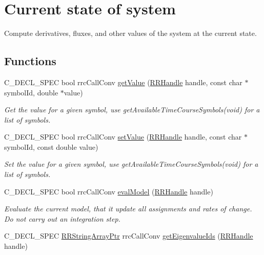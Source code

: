 \hypertarget{group__state}{}\section{Current state of system}
\label{group__state}


Compute derivatives, fluxes, and other values of the system at the current state.  


\subsection*{Functions}
\begin{DoxyCompactItemize}
\item 
C\+\_\+\+D\+E\+C\+L\+\_\+\+S\+P\+E\+C bool rrc\+Call\+Conv \hyperlink{group__state_ga6ff35b4282c583424f4d5708330012b9}{get\+Value} (\hyperlink{rrc__types_8h_a1d68f0592372208fa5a5f2799ea4b3ae}{R\+R\+Handle} handle, const char $\ast$symbol\+Id, double $\ast$value)
\begin{DoxyCompactList}\small\item\em Get the value for a given symbol, use get\+Available\+Time\+Course\+Symbols(void) for a list of symbols. \end{DoxyCompactList}\item 
C\+\_\+\+D\+E\+C\+L\+\_\+\+S\+P\+E\+C bool rrc\+Call\+Conv \hyperlink{group__state_gab8416894a99ef18924c1a719be4521f3}{set\+Value} (\hyperlink{rrc__types_8h_a1d68f0592372208fa5a5f2799ea4b3ae}{R\+R\+Handle} handle, const char $\ast$symbol\+Id, const double value)
\begin{DoxyCompactList}\small\item\em Set the value for a given symbol, use get\+Available\+Time\+Course\+Symbols(void) for a list of symbols. \end{DoxyCompactList}\item 
C\+\_\+\+D\+E\+C\+L\+\_\+\+S\+P\+E\+C bool rrc\+Call\+Conv \hyperlink{group__state_ga045d3842446954ba06e4010e19a2f1b1}{eval\+Model} (\hyperlink{rrc__types_8h_a1d68f0592372208fa5a5f2799ea4b3ae}{R\+R\+Handle} handle)
\begin{DoxyCompactList}\small\item\em Evaluate the current model, that it update all assignments and rates of change. Do not carry out an integration step. \end{DoxyCompactList}\item 
C\+\_\+\+D\+E\+C\+L\+\_\+\+S\+P\+E\+C \hyperlink{rrc__types_8h_a7c9475df6c7337d99482b13a365e7596}{R\+R\+String\+Array\+Ptr} rrc\+Call\+Conv \hyperlink{group__state_ga37cb4ffafece558c4b6f1af4e53667b9}{get\+Eigenvalue\+Ids} (\hyperlink{rrc__types_8h_a1d68f0592372208fa5a5f2799ea4b3ae}{R\+R\+Handle} handle)

\end{DoxyCompactItemize}
